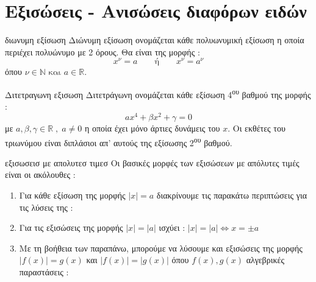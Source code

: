 \section{Εξισώσεις - Ανισώσεις διαφόρων ειδών}
\orismoi
\begin{orismos}{διωνυμη εξίσωση}
Διώνυμη εξίσωση ονομάζεται κάθε πολυωνυμική εξίσωση η οποία περιέχει πολυώνυμο με 2 όρους. Θα είναι της μορφής :
\[ x^\nu=a\qquad\textrm{ή}\qquad x^\nu=a^\nu \] όπου  $ \nu\in\mathbb{N}\textrm{ και }a\in\mathbb{R} $.
\end{orismos}
\begin{orismos}{Διτετραγωνη εξισωση}
Διτετράγωνη ονομάζεται κάθε εξίσωση 4\textsuperscript{ου} βαθμού της μορφής :
\[ ax^4+\beta x^2+\gamma=0 \]
με $ a,\beta,\gamma\in\mathbb{R}\;,\;a\neq0 $ η οποία έχει μόνο άρτιες δυνάμεις του $ x $. Οι εκθέτες του τριωνύμου είναι διπλάσιοι απ' αυτούς της εξίσωσης 2\textsuperscript{ου} βαθμού.
\end{orismos}
\thewrhmata
\begin{thewrhma}{εξισωσεισ με απολυτεσ τιμεσ}
Οι βασικές μορφές των εξισώσεων με απόλυτες τιμές είναι οι ακόλουθες :
\begin{enumerate}[itemsep=0mm]
\item Για κάθε εξίσωση της μορφής $ |x|=a $ διακρίνουμε τις παρακάτω περιπτώσεις για τις λύσεις της :
\item Για τις εξισώσεις της μορφής $ |x|=|a| $ ισχύει : $ |x|=|a|\Leftrightarrow x=\pm a $
\item Με τη βοήθεια των παραπάνω, μπορούμε να λύσουμε και εξισώσεις της μορφής $ \left|f(x) \right|=g(x)  $ και $ \left|f(x) \right| =\left|g(x) \right|  $ όπου $ f(x),g(x) $ αλγεβρικές παραστάσεις :
\end{enumerate}
\end{thewrhma}

